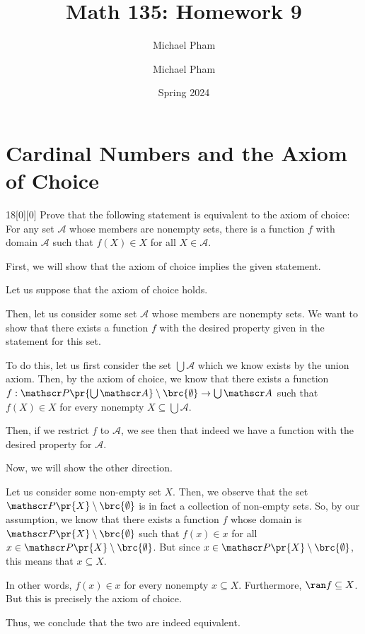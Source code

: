 \documentclass{article}
\title{#1}
\author{Michael Pham}
\date{#2}
\renewcommand{\mytitle}[2]{%
	\title{#1}
	\author{Michael Pham}
	\date{#2}
	\maketitle
	\newpage
	\listoftheorems
	\newpage
}
\begin{document}
\mytitle{Math 135: Homework 9}{Spring 2024}

\setcounter{section}{5}
\section{Cardinal Numbers and the Axiom of Choice}
\begin{hw}{18}[0][0]
	Prove that the following statement is equivalent to the axiom of choice: For any set $\mathscr A$ whose members are nonempty sets, there is a function $f$ with domain $\mathscr A$ such that $f(X) \in X$ for all $X \in \mathscr A$.
\end{hw}
\begin{solution}
%	
	First, we will show that the axiom of choice implies the given statement.
	\begin{innerproof}
		Let us suppose that the axiom of choice holds.
		
		Then, let us consider some set $\mathscr A$ whose members are nonempty sets. We want to show that there exists a function $f$ with the desired property given in the statement for this set.
		
		To do this, let us first consider the set $\bigcup \mathscr A$ which we know exists by the union axiom. Then, by the axiom of choice, we know that there exists a function $f : \mathscr P \pr{\bigcup \mathscr A} \setminus \brc{\emptyset} \rightarrow \bigcup \mathscr A$ such that $f(X) \in X$ for every nonempty $X \subseteq \bigcup \mathscr A$.
		
		Then, if we restrict $f$ to $\mathscr A$, we see then that indeed we have a function with the desired property for $\mathscr A$.
	\end{innerproof}

	Now, we will show the other direction.
	\begin{innerproof}
		Let us consider some non-empty set $X$. Then, we observe that the set $\mathscr P\pr{X} \setminus \brc{\emptyset}$ is in fact a collection of non-empty sets. So, by our assumption, we know that there exists a function $f$ whose domain is $\mathscr P\pr{X} \setminus \brc{\emptyset}$ such that $f(x) \in x$ for all $x \in \mathscr P \pr{X} \setminus \brc{\emptyset}$. But since $x \in \mathscr P \pr{X} \setminus \brc{\emptyset}$, this means that $x \subseteq X$.
		
		In other words, $f(x) \in x$ for every nonempty $x \subseteq X$. Furthermore, $\ran f \subseteq X$. But this is precisely the axiom of choice.
	\end{innerproof}

	Thus, we conclude that the two are indeed equivalent.
\end{solution}
\end{document}

